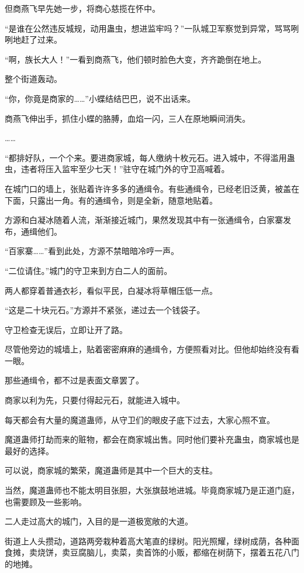 \begin{this_body}
但商燕飞早先她一步，将商心慈揽在怀中。

“是谁在公然违反城规，动用蛊虫，想进监牢吗？”一队城卫军察觉到异常，骂骂咧咧地赶了过来。

“啊，族长大人！”一看到商燕飞，他们顿时脸色大变，齐齐跪倒在地上。

整个街道轰动。

“你，你竟是商家的……”小蝶结结巴巴，说不出话来。

商燕飞伸出手，抓住小蝶的胳膊，血焰一闪，三人在原地瞬间消失。

……

“都排好队，一个个来。要进商家城，每人缴纳十枚元石。进入城中，不得滥用蛊虫，违者将压入监牢至少七天！”驻守在城门外的守卫高喊着。

在城门口的墙上，张贴着许许多多的通缉令。有些通缉令，已经老旧泛黄，被盖在下面，只露出一角。有的通缉令，则是全新，随意地贴着。

方源和白凝冰随着人流，渐渐接近城门，果然发现其中有一张通缉令，白家寨发布，通缉他们。

“百家寨……”看到此处，方源不禁暗暗冷哼一声。

“二位请住。”城门的守卫来到方白二人的面前。

两人都穿着普通衣衫，看似平民，白凝冰将草帽压低一点。

“这是二十块元石。”方源并不紧张，递过去一个钱袋子。

守卫检查无误后，立即让开了路。

尽管他旁边的城墙上，贴着密密麻麻的通缉令，方便照看对比。但他却始终没有看一眼。

那些通缉令，都不过是表面文章罢了。

商家以利为先，只要付得起元石，就能进入城中。

每天都会有大量的魔道蛊师，从守卫们的眼皮子底下过去，大家心照不宣。

魔道蛊师打劫而来的赃物，都会在商家城出售。同时他们要补充蛊虫，商家城也是最好的选择。

可以说，商家城的繁荣，魔道蛊师是其中一个巨大的支柱。

当然，魔道蛊师也不能太明目张胆，大张旗鼓地进城。毕竟商家城乃是正道门庭，也需要顾及一些影响。

二人走过高大的城门，入目的是一道极宽敞的大道。

街道上人头攒动，道路两旁栽种着高大笔直的绿树。阳光照耀，绿树成荫，各种面食摊，卖烧饼，卖豆腐脑儿，卖菜，卖首饰的小贩，都缩在树荫下，摆着五花八门的地摊。


\end{this_body}
